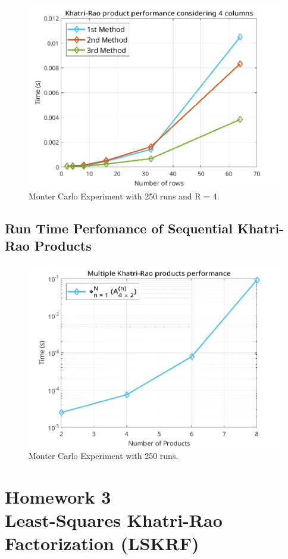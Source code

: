 \documentclass[a4paper,10pt]{article}
\begin{document}
    \begin{figure}[ht!]
        \centering 
        \includegraphics[width=0.75\linewidth]{figs/hw2a2.png} \par 
        \caption{Monter Carlo Experiment with 250 runs and R = 4.}
        \label{fig:hw2a2} 
    \end{figure}

    \subsection*{Run Time Perfomance of Sequential Khatri-Rao Products}

    \begin{figure}[ht!]
        \centering 
        \includegraphics[width=0.75\linewidth]{figs/hw2a3.png} \par 
        \caption{Monter Carlo Experiment with 250 runs.}
        \label{fig:hw2a3} 
    \end{figure}

\newpage
\section*{Homework 3 \\ Least-Squares Khatri-Rao Factorization (LSKRF)}
\end{document}
